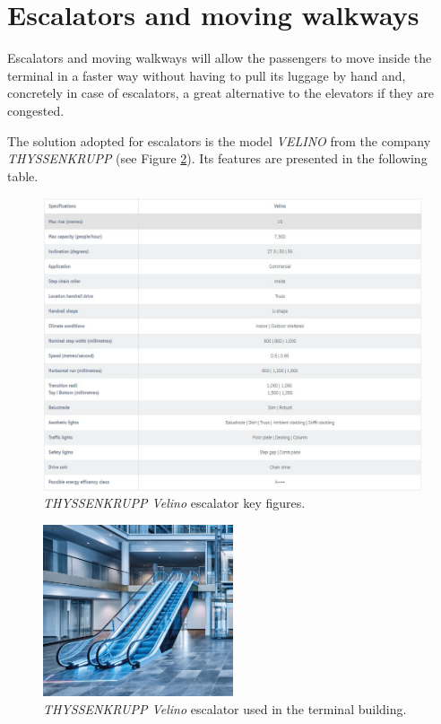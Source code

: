 	\section{Escalators and moving walkways}
Escalators and moving walkways will allow the passengers to move inside the terminal in a faster way without having to pull its luggage by hand and, concretely in case of escalators, a great alternative to the elevators if they are congested.

The solution adopted for escalators is the model \textit{VELINO} from the company \textit{THYSSENKRUPP} (see Figure \ref{velino2}). Its features are presented in the following table.

\begin{figure}[H]
	\centering
	\includegraphics[clip, trim=0cm 0cm 0cm 0cm, width=1\textwidth]{./images/indoorclosures/velino}
	\caption{\textit{THYSSENKRUPP Velino} escalator key figures.}
	\label{velino}
\end{figure}

\begin{figure}[H]
	\centering
	\includegraphics[clip, trim=0cm 0cm 0cm 0cm, width=0.5\textwidth]{./images/indoorclosures/velino2}
	\caption{\textit{THYSSENKRUPP Velino} escalator used in the terminal building.}
	\label{velino2}
\end{figure}

